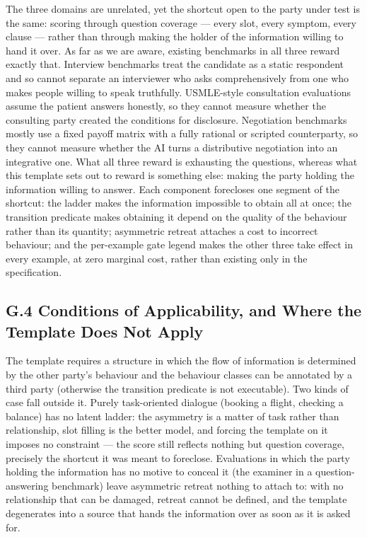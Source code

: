 \documentclass[letterpaper]{article}
\begin{document}
The three domains are unrelated, yet the shortcut open to the party under test is the same: scoring through question coverage --- every slot, every symptom, every clause --- rather than through making the holder of the information willing to hand it over. As far as we are aware, existing benchmarks in all three reward exactly that. Interview benchmarks treat the candidate as a static respondent and so cannot separate an interviewer who asks comprehensively from one who makes people willing to speak truthfully. USMLE-style consultation evaluations assume the patient answers honestly, so they cannot measure whether the consulting party created the conditions for disclosure. Negotiation benchmarks mostly use a fixed payoff matrix with a fully rational or scripted counterparty, so they cannot measure whether the AI turns a distributive negotiation into an integrative one. What all three reward is exhausting the questions, whereas what this template sets out to reward is something else: making the party holding the information willing to answer. Each component forecloses one segment of the shortcut: the ladder makes the information impossible to obtain all at once; the transition predicate makes obtaining it depend on the quality of the behaviour rather than its quantity; asymmetric retreat attaches a cost to incorrect behaviour; and the per-example gate legend makes the other three take effect in every example, at zero marginal cost, rather than existing only in the specification.


\subsection*{G.4 Conditions of Applicability, and Where the Template Does Not Apply}

The template requires a structure in which the flow of information is determined by the other party's behaviour and the behaviour classes can be annotated by a third party (otherwise the transition predicate is not executable). Two kinds of case fall outside it. Purely task-oriented dialogue (booking a flight, checking a balance) has no latent ladder: the asymmetry is a matter of task rather than relationship, slot filling is the better model, and forcing the template on it imposes no constraint --- the score still reflects nothing but question coverage, precisely the shortcut it was meant to foreclose. Evaluations in which the party holding the information has no motive to conceal it (the examiner in a question-answering benchmark) leave asymmetric retreat nothing to attach to: with no relationship that can be damaged, retreat cannot be defined, and the template degenerates into a source that hands the information over as soon as it is asked for.
\end{document}
